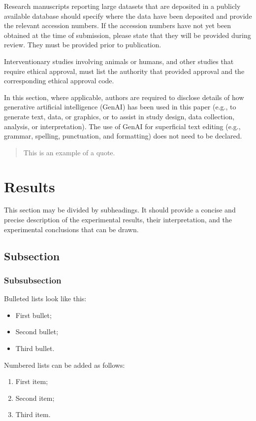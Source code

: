 \documentclass[geomatics,article,submit,moreauthors]{Definitions/mdpi}
\begin{document}
Research manuscripts reporting large datasets that are deposited in a publicly available database should specify where the data have been deposited and provide the relevant accession numbers. If the accession numbers have not yet been obtained at the time of submission, please state that they will be provided during review. They must be provided prior to publication.

Interventionary studies involving animals or humans, and other studies that require ethical approval, must list the authority that provided approval and the corresponding ethical approval code.

In this section, where applicable, authors are required to disclose details of how generative artificial intelligence (GenAI) has been used in this paper (e.g., to generate text, data, or graphics, or to assist in study design, data collection, analysis, or interpretation). The use of GenAI for superficial text editing (e.g., grammar, spelling, punctuation, and formatting) does not need to be declared.

\begin{quote}
This is an example of a quote.
\end{quote}

\section{Results}

This section may be divided by subheadings. It should provide a concise and precise description of the experimental results, their interpretation, and the experimental conclusions that can be drawn.

\subsection{Subsection}
\subsubsection{Subsubsection}

Bulleted lists look like this:
\begin{itemize}
\item	First bullet;
\item	Second bullet;
\item	Third bullet.
\end{itemize}

Numbered lists can be added as follows:
\begin{enumerate}
\item	First item; 
\item	Second item;
\item	Third item.
\end{enumerate}
\end{document}
